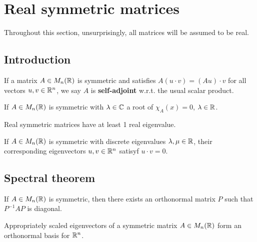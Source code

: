 \documentclass[../Year1.tex]{subfiles}
\begin{document}
\section{Real symmetric matrices}
Throughout this section, unsurprisingly, all matrices will be assumed to be real.
\subsection{Introduction}

\begin{definition}
    If a matrix $A\in M_n(\mathbb{R})$ is symmetric and satisfies $A(u\cdot v) = (Au)\cdot v$ for all vectors $u,v\in\mathbb{R}^n$, we say $A$ is \textbf{self-adjoint} w.r.t. the usual scalar product.
\end{definition}

\begin{theorem}
    If $A\in M_n(\mathbb{R})$ is symmetric with $\lambda\in\mathbb{C}$ a root of $\chi_A(x)=0$, $\lambda\in\mathbb{R}$.
\end{theorem}

\begin{corollary}
    Real symmetric matrices have at least 1 real eigenvalue.
\end{corollary}

\begin{theorem}
    If $A\in M_n(\mathbb{R})$ is symmetric with discrete eigenvalues $\lambda,\mu\in\mathbb{R}$, their corresponding eigenvectors $u,v\in\mathbb{R}^n$ satisyf $u\cdot v=0$.
\end{theorem}

\subsection{Spectral theorem}
    
\begin{theorem}
    If $A\in M_n(\mathbb{R})$ is symmetric, then there exists an orthonormal matrix $P$ such that $P^{-1}AP$ is diagonal.
\end{theorem}

\begin{corollary}
    Appropriately scaled eigenvectors of a symmetric matrix $A\in M_n(\mathbb{R})$ form an orthonormal basis for $\mathbb{R}^n$.
\end{corollary}
\end{document}
